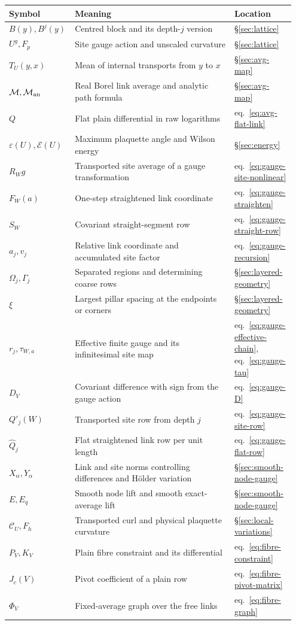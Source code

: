 \documentclass[11pt,letterpaper,reqno]{amsart}
\numberwithin{equation}{section}
\renewcommand{\eqref}[1]{\textup{eq.~\ref{#1}}}
\theoremstyle{definition}
\theoremstyle{remark}
\begin{document}
\begingroup
\setlength{\tabcolsep}{4pt}
\renewcommand{\arraystretch}{1.2}
\begin{longtable}{@{}p{0.19\linewidth}p{0.55\linewidth}p{0.21\linewidth}@{}}
\hline
Symbol & Meaning & Location\\
\hline
\endhead
\(B(y),B^j(y)\) & Centred block and its depth-\(j\) version
    & \S\ref{sec:lattice}\\
\(U^g,F_p\) & Site gauge action and unscaled curvature
    & \S\ref{sec:lattice}\\
\(T_U(y,x)\) & Mean of internal transports from \(y\) to \(x\)
    & \S\ref{sec:avg-map}\\
\(\mathcal M,\mathcal M_{\rm an}\) & Real Borel link average and analytic path formula
    & \S\ref{sec:avg-map}\\
\(Q\) & Flat plain differential in raw logarithms
    & \eqref{eq:avg-flat-link}\\
\(\varepsilon(U),\mathcal E(U)\) & Maximum plaquette angle and Wilson energy
    & \S\ref{sec:energy}\\
\(R_W g\) & Transported site average of a gauge transformation
    & \eqref{eq:gauge-site-nonlinear}\\
\(F_W(a)\) & One-step straightened link coordinate
    & \eqref{eq:gauge-straighten}\\
\(S_W\) & Covariant straight-segment row
    & \eqref{eq:gauge-straight-row}\\
\(a_j,v_j\) & Relative link coordinate and accumulated site factor
    & \eqref{eq:gauge-recursion}\\
\(\Omega_j,\Gamma_j\) & Separated regions and determining coarse rows
    & \S\ref{sec:layered-geometry}\\
\(\xi\) & Largest pillar spacing at the endpoints or corners
    & \S\ref{sec:layered-geometry}\\
\(r_j,\tau_{W,a}\) & Effective finite gauge and its infinitesimal site map
    & \eqref{eq:gauge-effective-chain}, \eqref{eq:gauge-tau}\\
\(D_V\) & Covariant difference with sign from the gauge action
    & \eqref{eq:gauge-D}\\
\(Q'_j(W)\) & Transported site row from depth \(j\)
    & \eqref{eq:gauge-site-row}\\
\(\widehat Q_j\) & Flat straightened link row per unit length
    & \eqref{eq:gauge-flat-row}\\
\(X_\alpha,Y_\alpha\) & Link and site norms controlling differences and H\"older variation
    & \S\ref{sec:smooth-node-gauge}\\
\(E,E_q\) & Smooth node lift and smooth exact-average lift
    & \S\ref{sec:smooth-node-gauge}\\
\(\mathcal C_U,F_h\) & Transported curl and physical plaquette curvature
    & \S\ref{sec:local-variations}\\
\(P_V,K_V\) & Plain fibre constraint and its differential
    & \eqref{eq:fibre-constraint}\\
\(J_c(V)\) & Pivot coefficient of a plain row
    & \eqref{eq:fibre-pivot-matrix}\\
\(\Phi_V\) & Fixed-average graph over the free links
    & \eqref{eq:fibre-graph}\\
\hline
\end{longtable}
\end{document}
